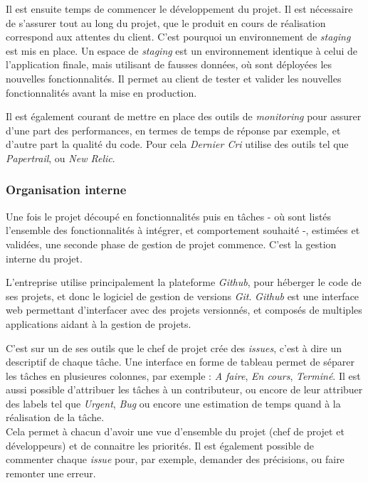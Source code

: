 \documentclass[12pt,a4paper]{article}
\begin{document}
  Il est ensuite temps de commencer le développement du projet. Il est
  nécessaire de s'assurer tout au long du projet, que le produit en cours
  de réalisation correspond aux attentes du client. C'est pourquoi un
  environnement de \emph{staging} est mis en place. Un espace de
  \emph{staging} est un environnement identique à celui de l'application
  finale, mais utilisant de fausses données, où sont déployées les
  nouvelles fonctionnalités. Il permet au client de tester et valider les
  nouvelles fonctionnalités avant la mise en production.

  \bigskip

  Il est également courant de mettre en place des outils de
  \emph{monitoring} pour assurer d'une part des performances, en termes de
  temps de réponse par exemple, et d'autre part la qualité du code. Pour
  cela \emph{Dernier Cri} utilise des outils tel que \emph{Papertrail}, ou
  \emph{New Relic}.

  \bigskip

  \subsubsection{Organisation interne}\label{organisation-interne}

  \bigskip

  Une fois le projet découpé en fonctionnalités puis en tâches - où sont
  listés l'ensemble des fonctionnalités à intégrer, et comportement
  souhaité -, estimées et validées, une seconde phase de gestion de projet
  commence. C'est la gestion interne du projet.

  L'entreprise utilise principalement la plateforme \emph{Github}, pour
  héberger le code de ses projets, et donc le logiciel de gestion de
  versions \emph{Git}. \emph{Github} est une interface web permettant
  d'interfacer avec des projets versionnés, et composés de multiples
  applications aidant à la gestion de projets.

  \bigskip

  C'est sur un de ses outils que le chef de projet crée des \emph{issues},
  c'est à dire un descriptif de chaque tâche. Une interface en forme de
  tableau permet de séparer les tâches en plusieures colonnes, par exemple
  : \emph{A faire}, \emph{En cours}, \emph{Terminé}. Il est aussi possible
  d'attribuer les tâches à un contributeur, ou encore de leur attribuer
  des labels tel que \emph{Urgent}, \emph{Bug} ou encore une estimation de
  temps quand à la réalisation de la tâche.\\
  Cela permet à chacun d'avoir une vue d'ensemble du projet (chef de
  projet et développeurs) et de connaitre les priorités. Il est également
  possible de commenter chaque \emph{issue} pour, par exemple, demander
  des précisions, ou faire remonter une erreur.
\end{document}
